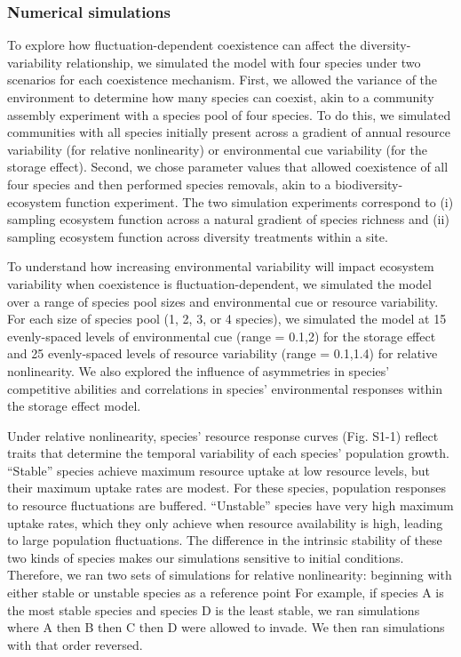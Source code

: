 \documentclass[12pt,]{article}
\begin{document}
\subsubsection{Numerical simulations}\label{numerical-simulations}

To explore how fluctuation-dependent coexistence can affect the
diversity-variability relationship, we simulated the model with four
species under two scenarios for each coexistence mechanism. First, we
allowed the variance of the environment to determine how many species
can coexist, akin to a community assembly experiment with a species pool
of four species. To do this, we simulated communities with all species
initially present across a gradient of annual resource variability (for
relative nonlinearity) or environmental cue variability (for the storage
effect). Second, we chose parameter values that allowed coexistence of
all four species and then performed species removals, akin to a
biodiversity-ecosystem function experiment. The two simulation
experiments correspond to (i) sampling ecosystem function across a
natural gradient of species richness and (ii) sampling ecosystem
function across diversity treatments within a site.

To understand how increasing environmental variability will impact
ecosystem variability when coexistence is fluctuation-dependent, we
simulated the model over a range of species pool sizes and environmental
cue or resource variability. For each size of species pool (1, 2, 3, or
4 species), we simulated the model at 15 evenly-spaced levels of
environmental cue (range = 0.1,2) for the storage effect and 25
evenly-spaced levels of resource variability (range = 0.1,1.4) for
relative nonlinearity. We also explored the influence of asymmetries in
species' competitive abilities and correlations in species'
environmental responses within the storage effect model.

Under relative nonlinearity, species' resource response curves (Fig.
S1-1) reflect traits that determine the temporal variability of each
species' population growth. ``Stable'' species achieve maximum resource
uptake at low resource levels, but their maximum uptake rates are
modest. For these species, population responses to resource fluctuations
are buffered. ``Unstable'' species have very high maximum uptake rates,
which they only achieve when resource availability is high, leading to
large population fluctuations. The difference in the intrinsic stability
of these two kinds of species makes our simulations sensitive to initial
conditions. Therefore, we ran two sets of simulations for relative
nonlinearity: beginning with either stable or unstable species as a
reference point For example, if species A is the most stable species and
species D is the least stable, we ran simulations where A then B then C
then D were allowed to invade. We then ran simulations with that order
reversed.
\end{document}
